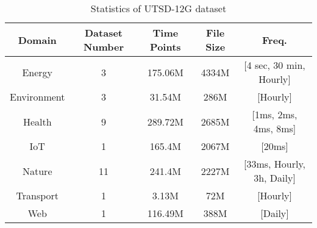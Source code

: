 \begin{table*}[]
\centering
\caption{Statistics of UTSD-12G dataset}
\label{table:statistics of UTSD-12G}
\small  %
\setlength{\tabcolsep}{4pt} %
\renewcommand{\arraystretch}{0.8} %
\begin{tabular}{c|c|c|c|c}
\toprule
Domain & Dataset Number & Time Points & File Size & Freq.  \\ \midrule
Energy & 3 & 175.06M & 4334M & {[}4 sec, 30 min, Hourly{]} \\
Environment & 3 & 31.54M & 286M & {[}Hourly{]} \\
Health & 9 & 289.72M & 2685M & {[}1ms, 2ms, 4ms, 8ms{]} \\
IoT & 1 & 165.4M & 2067M & {[}20ms{]}  \\
Nature & 11 & 241.4M & 2227M & {[}33ms, Hourly, 3h, Daily{]}  \\
Transport & 1 & 3.13M & 72M & {[}Hourly{]}  \\
Web & 1 & 116.49M & 388M & {[}Daily{]}   \\ 
            \bottomrule
\end{tabular}
\end{table*}